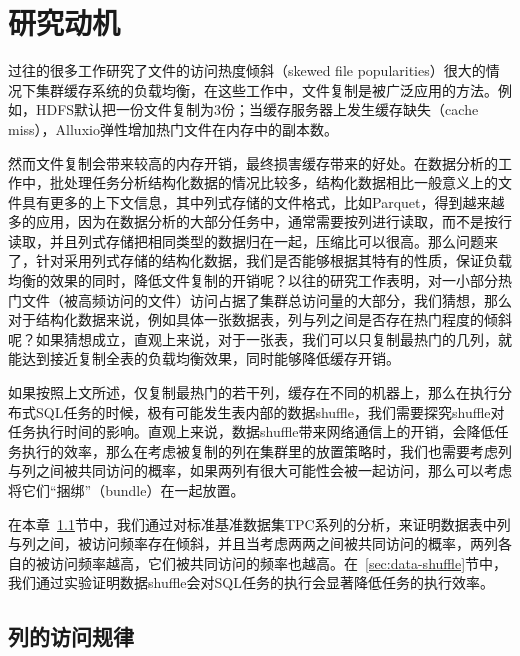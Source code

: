
\chapter{研究动机}
\label{chp:motivation}


\par 过往的很多工作研究了文件的访问热度倾斜（skewed file popularities）很大的情况下集群缓存系统的负载均衡，在这些工作中，文件复制是被广泛应用的方法。例如，HDFS默认把一份文件复制为3份；当缓存服务器上发生缓存缺失（cache miss），Alluxio弹性增加热门文件在内存中的副本数。

\par 然而文件复制会带来较高的内存开销，最终损害缓存带来的好处。在数据分析的工作中，批处理任务分析结构化数据的情况比较多，结构化数据相比一般意义上的文件具有更多的上下文信息，其中列式存储的文件格式，比如Parquet\cite{parquet}，得到越来越多的应用，因为在数据分析的大部分任务中，通常需要按列进行读取，而不是按行读取，并且列式存储把相同类型的数据归在一起，压缩比可以很高。那么问题来了，针对采用列式存储的结构化数据，我们是否能够根据其特有的性质，保证负载均衡的效果的同时，降低文件复制的开销呢？以往的研究工作表明，对一小部分热门文件（被高频访问的文件）访问占据了集群总访问量的大部分，我们猜想，那么对于结构化数据来说，例如具体一张数据表，列与列之间是否存在热门程度的倾斜呢？如果猜想成立，直观上来说，对于一张表，我们可以只复制最热门的几列，就能达到接近复制全表的负载均衡效果，同时能够降低缓存开销。

\par 如果按照上文所述，仅复制最热门的若干列，缓存在不同的机器上，那么在执行分布式SQL任务的时候，极有可能发生表内部的数据shuffle，我们需要探究shuffle对任务执行时间的影响。直观上来说，数据shuffle带来网络通信上的开销，会降低任务执行的效率，那么在考虑被复制的列在集群里的放置策略时，我们也需要考虑列与列之间被共同访问的概率，如果两列有很大可能性会被一起访问，那么可以考虑将它们“捆绑”（bundle）在一起放置。

\par 在本章~\ref{sec:col-access}节中，我们通过对标准基准数据集TPC系列的分析，来证明数据表中列与列之间，被访问频率存在倾斜，并且当考虑两两之间被共同访问的概率，两列各自的被访问频率越高，它们被共同访问的频率也越高。在~\ref{sec:data-shuffle}节中，我们通过实验证明数据shuffle会对SQL任务的执行会显著降低任务的执行效率。

\section{列的访问规律}
\label{sec:col-access}

